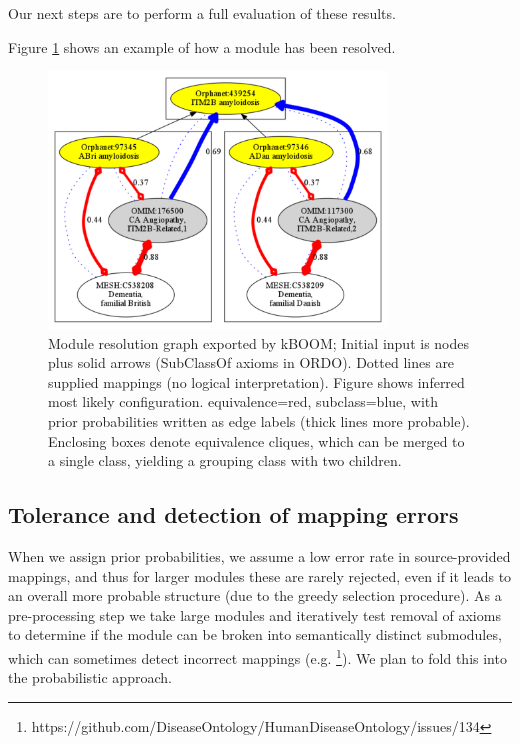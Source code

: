 \documentclass{my}
\begin{document}
Our next steps are to perform a full evaluation of these results.

Figure \ref{fig:graph} shows an example of how a module has been
resolved.

\begin{figure}
\center
\includegraphics[width=9cm]{amyloidosis}
\caption{Module resolution graph exported by kBOOM; Initial input is nodes plus solid arrows (SubClassOf axioms in ORDO). Dotted lines are supplied mappings (no logical interpretation). Figure shows inferred most likely configuration. equivalence=red,
  subclass=blue, with prior probabilities written
  as edge labels (thick lines more probable). Enclosing boxes
  denote equivalence cliques, which can be merged to a single class, yielding a grouping class with two children.}
\label{fig:graph}
\end{figure}

\subsection{Tolerance and detection of mapping errors}

When we assign prior probabilities, we assume a low error rate in
source-provided mappings, and thus for larger modules these are rarely
rejected, even if it leads to an overall more probable structure (due
to the greedy selection procedure). As a pre-processing step we
take large modules and iteratively test removal of axioms to determine
if the module can be broken into semantically distinct submodules, which
can sometimes detect incorrect mappings (e.g. \footnote{https://github.com/DiseaseOntology/HumanDiseaseOntology/issues/134}). We
plan to fold this into the probabilistic approach.


\end{document}
